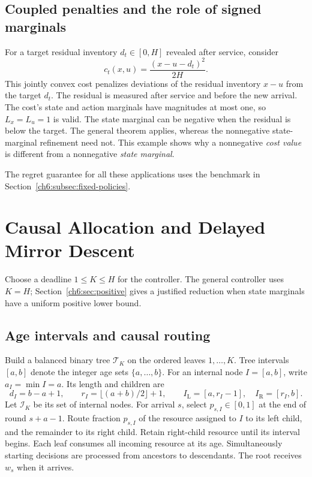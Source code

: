 \documentclass[11pt]{article}
\theoremstyle{plain}
\theoremstyle{remark}
\numberwithin{equation}{section}
\begin{document}
\subsection{Coupled penalties and the role of signed marginals}
\label{ch6:subsec:coupled-penalties}

For a target residual inventory $d_t\in[0,H]$ revealed after service, consider
\[
 c_t(x,u)=\frac{(x-u-d_t)^2}{2H}.
\]
This jointly convex cost penalizes deviations of the residual inventory
$x-u$ from the target $d_t$. The residual is measured after service and
before the new arrival. The cost's state and action marginals have magnitudes at
most one, so $L_x=L_u=1$ is valid. The state marginal can be negative when
the residual is below the target. The general theorem applies, whereas the
nonnegative state-marginal refinement need not. This example shows why a nonnegative
\emph{cost value} is different from a nonnegative \emph{state marginal}.

The regret guarantee for all these applications uses the benchmark in
Section~\ref{ch6:subsec:fixed-policies}.

\section{Causal Allocation and Delayed Mirror Descent}
\label{ch6:sec:algorithm}
Choose a deadline $1\le K\le H$ for the controller. The general controller uses
$K=H$; Section~\ref{ch6:sec:positive} gives a justified reduction when
state marginals have a uniform positive lower bound.

\subsection{Age intervals and causal routing}
Build a balanced binary tree $\mathcal{T}_K$ on the ordered leaves $1,\ldots,K$.
Tree intervals $[a,b]$ denote the integer age sets $\{a,\ldots,b\}$.
For an internal node $I=[a,b]$, write $a_I=\min I=a$. Its length
and children are
\begin{equation}\label{ch6:eq:tree-def}
 d_I=b-a+1,\qquad r_I=\lfloor(a+b)/2\rfloor+1,\qquad
 I_{\mathrm{L}}=[a,r_I-1],\quad I_{\mathrm{R}}=[r_I,b].
\end{equation}
Let $\mathcal{I}_K$ be its set of internal nodes.
For arrival $s$, select $p_{s,I}\in[0,1]$ at the end of round $s+a-1$.
Route fraction $p_{s,I}$ of the resource assigned to $I$ to its left child,
and the remainder to its right child. Retain right-child resource until
its interval begins. Each leaf consumes all incoming resource at its age.
Simultaneously starting decisions are processed from ancestors to descendants.
The root receives $w_s$ when it arrives.
\end{document}
